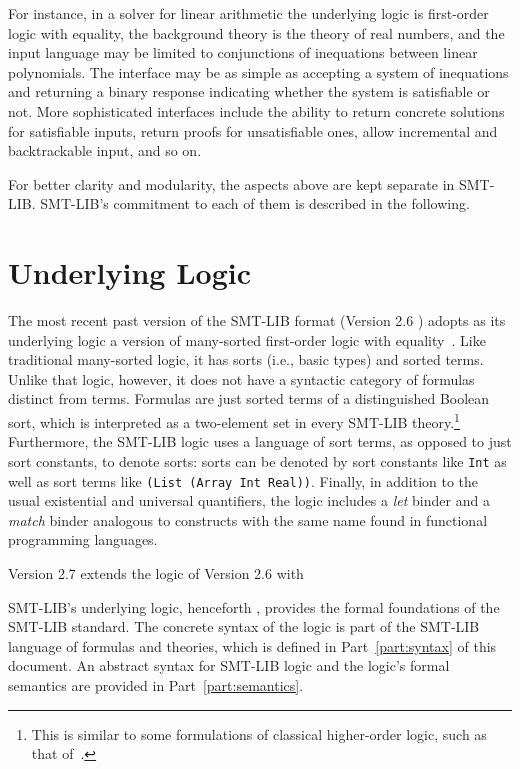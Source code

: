 For instance, in a solver for linear arithmetic
the underlying logic is first-order logic with equality,
the background theory is the theory of real numbers, and
the input language may be limited to conjunctions of inequations 
between linear polynomials.
The interface may be as simple as accepting a system
of inequations and returning a binary response indicating 
whether the system is satisfiable or not.
More sophisticated interfaces include
the ability to return concrete solutions for satisfiable inputs,
return proofs for unsatisfiable ones,
allow incremental and backtrackable input, and so on.

For better clarity and modularity, 
the aspects above are kept separate in SMT-LIB.
SMT-LIB's commitment to each of them is described in the following.


\section{Underlying Logic}


The most recent past version of the SMT-LIB format (Version 2.6 )
adopts as its underlying logic a version of many-sorted first-order logic 
with equality~\cite{Man-MSL-93,Gal-86,Hen-01}.
Like traditional many-sorted logic, it has sorts (i.e., basic types) 
and sorted terms.
Unlike that logic, however,
it does not have a syntactic category of formulas distinct from terms.
Formulas are just sorted terms of a distinguished Boolean sort,
which is interpreted as a two-element set in every SMT-LIB theory.\footnote{This is similar
to some formulations of classical higher-order logic, such as that of~\cite{andrews86}.}
Furthermore, the SMT-LIB logic uses a language of sort terms,
as opposed to just sort constants, to denote sorts:
sorts can be denoted by sort constants like \texttt{Int}
as well as sort terms like
\texttt{(List (Array Int Real))}.
Finally,
in addition to the usual existential and universal quantifiers, 
the logic includes a \emph{let} binder
and a \emph{match} binder
analogous to constructs with the same name
found in functional programming languages.

\begin{newver}
Version 2.7 extends the logic of Version 2.6 with 
\end{newver}

SMT-LIB's underlying logic,
henceforth ,
provides the formal foundations of the SMT-LIB standard.
The concrete syntax of the logic is part of the SMT-LIB language
of formulas and theories, which is defined in Part~\ref{part:syntax} 
of this document.
An abstract syntax for SMT-LIB logic and 
the logic's formal semantics are provided in Part~\ref{part:semantics}.



